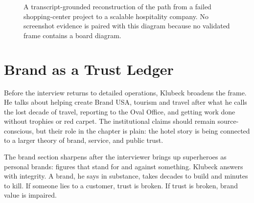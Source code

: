 \begin{figure}
\centering
{}
\caption{A transcript-grounded reconstruction of the path from a failed shopping-center project to a scalable hospitality company. No screenshot evidence is paired with this diagram because no validated frame contains a board diagram.}
\end{figure}

\section{Brand as a Trust Ledger}

Before the interview returns to detailed operations, Klubeck broadens the frame. He talks about helping create Brand USA, tourism and travel after what he calls the lost decade of travel, reporting to the Oval Office, and getting work done without trophies or red carpet. The institutional claims should remain source-conscious, but their role in the chapter is plain: the hotel story is being connected to a larger theory of brand, service, and public trust.

The brand section sharpens after the interviewer brings up superheroes as personal brands: figures that stand for and against something. Klubeck answers with integrity. A brand, he says in substance, takes decades to build and minutes to kill. If someone lies to a customer, trust is broken. If trust is broken, brand value is impaired.

